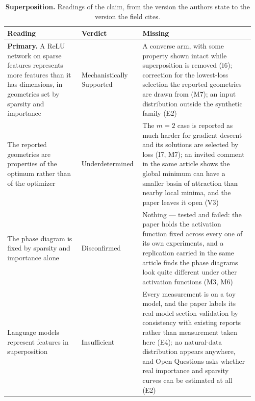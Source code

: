 \clearpage
\begin{table}[H]
\centering
\footnotesize
\caption{\textbf{Superposition.} Readings of the claim, from the version the authors state to the version the
field cites.}
\label{tab:superposition-readings}
\renewcommand{\arraystretch}{1.18}
\begin{tabular}{@{}>{\raggedright\arraybackslash}p{3.3cm}l>{\raggedright\arraybackslash}p{4.4cm}@{}}
\toprule
\textbf{Reading} & \textbf{Verdict} & \textbf{Missing} \\
\midrule
\textbf{Primary.} A ReLU network on sparse features represents more features than it has dimensions, in geometries set by sparsity and importance
  & Mechanistically Supported
  & A converse arm, with some property shown intact while superposition is removed (I6); correction for the lowest-loss selection the reported geometries are drawn from (M7); an input distribution outside the synthetic family (E2) \\
\addlinespace[2pt]
The reported geometries are properties of the optimum rather than of the optimizer
  & Underdetermined
  & The $m=2$ case is reported as much harder for gradient descent and its solutions are selected by loss (I7, M7); an invited comment in the same article shows the global minimum can have a smaller basin of attraction than nearby local minima, and the paper leaves it open (V3) \\
\addlinespace[2pt]
The phase diagram is fixed by sparsity and importance alone
  & Disconfirmed
  & Nothing --- tested and failed: the paper holds the activation function fixed across every one of its own experiments, and a replication carried in the same article finds the phase diagrams look quite different under other activation functions (M3, M6) \\
\addlinespace[2pt]
Language models represent features in superposition
  & Insufficient
  & Every measurement is on a toy model, and the paper labels its real-model section validation by consistency with existing reports rather than measurement taken here (E4); no natural-data distribution appears anywhere, and Open Questions asks whether real importance and sparsity curves can be estimated at all (E2) \\
\bottomrule
\end{tabular}
\end{table}

